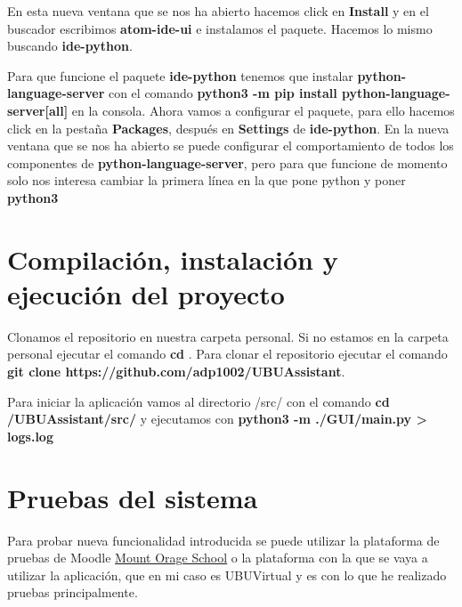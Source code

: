 
En esta nueva ventana que se nos ha abierto hacemos click en \textbf{Install} y en el buscador escribimos \textbf{atom-ide-ui} e instalamos el paquete. Hacemos lo mismo buscando \textbf{ide-python}.

 

Para que funcione el paquete \textbf{ide-python} tenemos que instalar \textbf{python-language-server} con el comando \textbf{python3 -m pip install python-language-server[all]} en la consola. Ahora vamos a configurar el paquete, para ello hacemos click en la pestaña \textbf{Packages}, después en \textbf{Settings} de \textbf{ide-python}. En la nueva ventana que se nos ha abierto se puede configurar el comportamiento de todos los componentes de \textbf{python-language-server}, pero para que funcione de momento solo nos interesa cambiar la primera línea en la que pone python y poner \textbf{python3}

 


\section{Compilación, instalación y ejecución del proyecto}

Clonamos el repositorio en nuestra carpeta personal. Si no estamos en la carpeta personal ejecutar el comando \textbf{cd \detokenize{~}}. Para clonar el repositorio ejecutar el comando \textbf{git clone https://github.com/adp1002/UBUAssistant}.

Para iniciar la aplicación vamos al directorio /src/ con el comando \textbf{cd \detokenize{~}/UBUAssistant/src/} y ejecutamos con \textbf{python3 -m ./GUI/main.py \detokenize{>}> logs.log}

\section{Pruebas del sistema}

Para probar nueva funcionalidad introducida se puede utilizar la plataforma de pruebas de Moodle \href{https://school.moodledemo.net/}{Mount Orage School} o la plataforma con la que se vaya a utilizar la aplicación, que en mi caso es UBUVirtual y es con lo que he realizado pruebas principalmente.